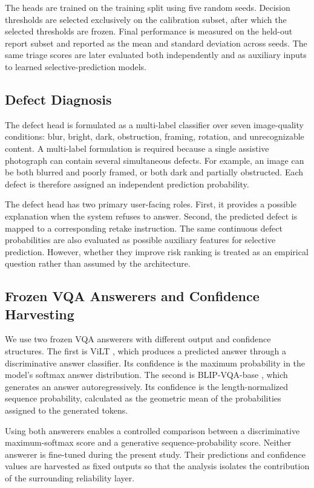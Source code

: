 \documentclass{ieeeaccess}
\newcommand{\vilt}{ViLT}
\newcommand{\blip}{BLIP}
\begin{document}
The heads are trained on the training split using five random
seeds. Decision thresholds are selected exclusively on the
calibration subset, after which the selected thresholds are frozen.
Final performance is measured on the held-out report subset and
reported as the mean and standard deviation across seeds. The
same triage scores are later evaluated both independently and as
auxiliary inputs to learned selective-prediction models.

\subsection{Defect Diagnosis}

The defect head is formulated as a multi-label classifier over
seven image-quality conditions: blur, bright, dark, obstruction,
framing, rotation, and unrecognizable content. A multi-label
formulation is required because a single assistive photograph can
contain several simultaneous defects. For example, an image can
be both blurred and poorly framed, or both dark and partially
obstructed. Each defect is therefore assigned an independent
prediction probability.

The defect head has two primary user-facing roles. First, it
provides a possible explanation when the system refuses to
answer. Second, the predicted defect is mapped to a corresponding
retake instruction. The same continuous defect probabilities are
also evaluated as possible auxiliary features for selective
prediction. However, whether they improve risk ranking is treated
as an empirical question rather than assumed by the architecture.

\subsection{Frozen VQA Answerers and Confidence Harvesting}

We use two frozen VQA answerers with different output and
confidence structures. The first is \vilt{} \cite{kim2021vilt},
which produces a predicted answer through a discriminative answer
classifier. Its confidence is the maximum probability in the
model's softmax answer distribution. The second is
\blip{}-VQA-base \cite{li2022blip}, which generates an answer
autoregressively. Its confidence is the length-normalized
sequence probability, calculated as the geometric mean of the
probabilities assigned to the generated tokens.

Using both answerers enables a controlled comparison between a
discriminative maximum-softmax score and a generative
sequence-probability score. Neither answerer is fine-tuned during
the present study. Their predictions and confidence values are
harvested as fixed outputs so that the analysis isolates the
contribution of the surrounding reliability layer.
\end{document}
